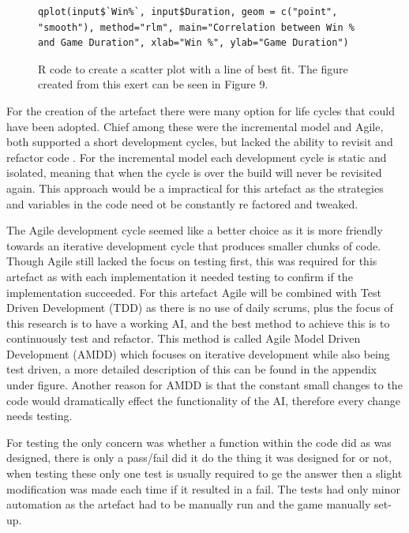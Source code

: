 \documentclass[journal]{IEEEtran}
\begin{document}
\begin{figure}[H]
	\begin{lstlisting}
qplot(input$`Win%`, input$Duration, geom = c("point",
"smooth"), method="rlm", main="Correlation between Win % and Game Duration", xlab="Win %", ylab="Game Duration")
\end{lstlisting}
	\caption{R code to create a scatter plot with a line of best fit. The figure created from this exert can be seen in Figure 9.}
	\label{Fig3}
\end{figure}

For the creation of the artefact there were many option for life cycles that could have been adopted. Chief among these were the incremental model and Agile, both supported a short development cycles, but lacked the ability to revisit and refactor code \cite{Life}. For the incremental model each development cycle is static and isolated, meaning that when the cycle is over the build will never be revisited again. This approach would be a impractical for this artefact as the strategies and variables in the code need ot be constantly re factored and tweaked.

The Agile development cycle seemed like a better choice as it is more friendly towards an iterative development cycle that produces smaller chunks of code. Though Agile still lacked 
the focus on testing first, this was required for this artefact as with each implementation it needed testing to confirm if the implementation succeeded. For this artefact Agile will be combined with Test Driven Development (TDD) as there is no use of daily scrums, plus the focus of this research is to have a working AI, and the best method to achieve this is to continuously test and refactor. This method is called Agile Model Driven Development (AMDD) which focuses on iterative development while also being test driven, a more detailed description of this can be found in the appendix under figure. Another reason for AMDD is that the constant small changes to the code would dramatically effect the functionality of the AI, therefore every change needs testing.

For testing the only concern was whether a function within the code did as was designed, there is only a pass/fail did it do the thing it was designed for or not, when testing these only one test is usually required to ge the answer then a slight modification was made each time if it resulted in a fail. The tests had only minor automation as the artefact had to be manually run and the game manually set-up.
\newline
\end{document}
